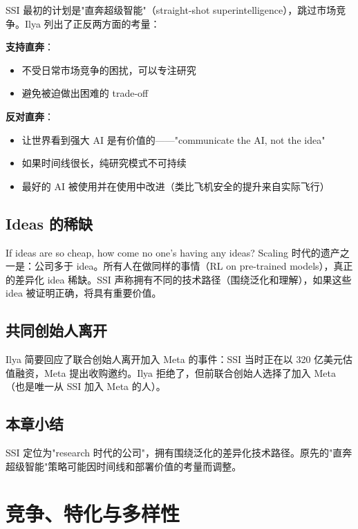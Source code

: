 \documentclass[a4paper]{article}
\begin{document}
SSI 最初的计划是"直奔超级智能"（straight-shot superintelligence），跳过市场竞争。Ilya 列出了正反两方面的考量：

\textbf{支持直奔}：
\begin{itemize}
    \item 不受日常市场竞争的困扰，可以专注研究
    \item 避免被迫做出困难的 trade-off
\end{itemize}

\textbf{反对直奔}：
\begin{itemize}
    \item 让世界看到强大 AI 是有价值的——"communicate the AI, not the idea"
    \item 如果时间线很长，纯研究模式不可持续
    \item 最好的 AI 被使用并在使用中改进（类比飞机安全的提升来自实际飞行）
\end{itemize}

\subsection{Ideas 的稀缺}

\begin{importantbox}{If ideas are so cheap, how come no one's having any ideas?}
Scaling 时代的遗产之一是：公司多于 idea。所有人在做同样的事情（RL on pre-trained models），真正的差异化 idea 稀缺。SSI 声称拥有不同的技术路径（围绕泛化和理解），如果这些 idea 被证明正确，将具有重要价值。
\end{importantbox}

\subsection{共同创始人离开}

Ilya 简要回应了联合创始人离开加入 Meta 的事件：SSI 当时正在以 320 亿美元估值融资，Meta 提出收购邀约。Ilya 拒绝了，但前联合创始人选择了加入 Meta（也是唯一从 SSI 加入 Meta 的人）。

\subsection{本章小结}

SSI 定位为"research 时代的公司"，拥有围绕泛化的差异化技术路径。原先的"直奔超级智能"策略可能因时间线和部署价值的考量而调整。


\section{竞争、特化与多样性}
\end{document}
